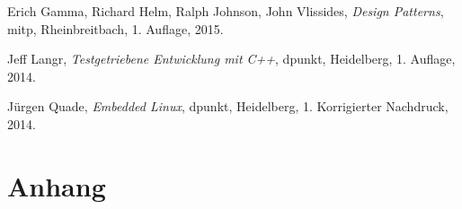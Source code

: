 \begin{thebibliography}{9}

  Erich Gamma, Richard Helm, Ralph Johnson, John Vlissides,
  \emph{Design Patterns},
  mitp, Rheinbreitbach,
  1. Auflage,
  2015.

  Jeff Langr,
  \emph{Testgetriebene Entwicklung mit C++},
  dpunkt, Heidelberg,
  1. Auflage,
  2014.
  
  Jürgen Quade,
  \emph{Embedded Linux},
  dpunkt, Heidelberg,
  1. Korrigierter Nachdruck,
  2014.

\end{thebibliography}

\listoffigures
\listoftables

\clearpage

\section{Anhang}